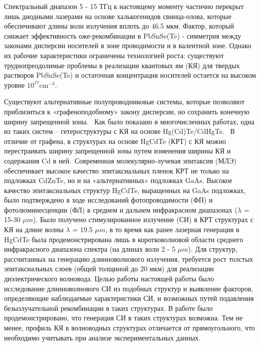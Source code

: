 Спектральный диапазон 5 - 15 ТГц к настоящему моменту частично 
перекрыт лишь диодными лазерами на основе халькогенидов свинца-олова, которые обеспечивают длины 
волн излучения вплоть до 46.5 мкм. Фактор, который снижает эффективность оже-рекомбинации в PbSnSe(Te)
- симметрия между законами дисперсии носителей в зоне проводимости и в валентной зоне. Однако их рабочие характеристики 
ограничены технологией роста: существуют труднопреодолимые проблемы в реализации квантовых ям (КЯ) для твердых растворов 
PbSnSe(Te) и остаточная концентрация носителей остается на высоком уровне $10^17 \text{cm}^{-3}$.

Существуют альтернативные полупроводниковые системы, которые позволяют
приблизиться к «графеноподобному» закону дисперсии, но сохранить конечную ширину запрещенной зоны. 
Как было показано в многочисленных работах, одна из таких систем -- гетероструктуры с КЯ на основе Hg(Cd)Te/CdHgTe. 
В отличие от графена, в структурах на основе HgCdTe (КРТ) с КЯ можно перестраивать ширину запрещенной зоны путем изменения ширины КЯ и 
содержания Cd в ней. Современная молекулярно-лучевая эпитаксия (МЛЭ) обеспечивает высокое качество эпитаксиальных пленок КРТ не только на подложках CdZnTe, 
но и на «альтернативных» подложках GaAs. Высокое качество эпитаксиальных структур HgCdTe, выращенных на GaAs подложках, было подтверждено в ходе исследований 
фотопроводимости (ФП) и фотолюминесценции (ФЛ) в среднем и дальнем инфракрасном диапазонах ($λ$ = 15-30 $\mu m$). Было получено 
стимулированное излучение (СИ) в КРТ структурах с КЯ на длине волны $λ$ = 19.5 $\mu m$, в то время как ранее лазерная генерация в HgCdTe была 
продемонстрирована лишь в коротковолновой области среднего инфракрасного диапазона спектра (на длинах волн 2 - 5 $\mu m$). 
Для структур, рассчитанных на генерацию длинноволнового излучения, требуется рост толстых эпитаксиальных слоев (общей толщиной до 20 мкм) для реализации диэлектрического волновода. 
Целью работы настоящей работы было исследование длинноволнового СИ из подобных структур и выявление факторов, определяющие наблюдаемые характеристики СИ, и возможных путей подавления 
безызлучательной рекомбинации в таких структурах. В работе было продемонстрировано, что генерация СИ в таких структурах возможна. Тем не менее, профиль КЯ в волноводных 
структурах отличается от прямоугольного, что необходимо учитывать при анализе экспериментальных данных.
\newpage
